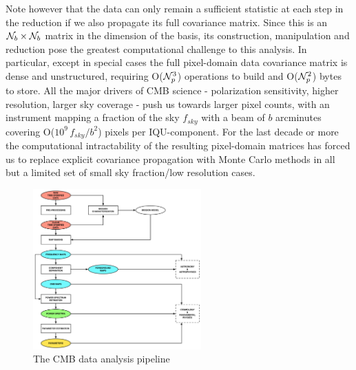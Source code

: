 Note however that the data can only remain a sufficient statistic at each step in the reduction if we also propagate its full covariance matrix. Since this is an ${\cal N}_b \times {\cal N}_b$ matrix in the dimension of the basis, its construction, manipulation and reduction pose the greatest computational challenge to this analysis. In particular, except in special cases the full pixel-domain data covariance matrix is dense and unstructured, requiring O(${\cal N}_p^3$) operations to build and O(${\cal N}_p^2$) bytes to store. All the major drivers of CMB science - polarization sensitivity, higher resolution, larger sky coverage - push us towards larger pixel counts, with an instrument mapping a fraction of the sky $f_{sky}$ with a beam of $b$ arcminutes covering O($10^9 \, f_{sky}/b^2$) pixels per IQU-component. For the last decade or more the computational intractability of the resulting pixel-domain matrices has forced us to replace explicit covariance propagation with Monte Carlo methods in all but a limited set of small sky fraction/low resolution cases.

\begin{figure}[htbp]
\centering
\includegraphics[width=0.575\textwidth]{Analysis/da}
\caption{The CMB data analysis pipeline}
\label{fig_da}
\end{figure}

